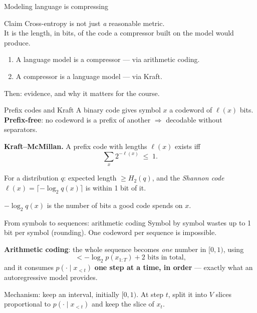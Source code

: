 \documentclass[11pt,aspectratio=169]{beamer}
\newcommand{\dest}[1]{\textcolor{structure}{\textbf{#1}}}
\begin{document}
\begin{frame}{Modeling language is compressing}
  \begin{block}{Claim}
    Cross-entropy is not just \emph{a} reasonable metric.\\
    It is the length, in bits, of the code a compressor built on the model would produce.
  \end{block}

  \vspace{1.2em}
  \begin{enumerate}
    \item A language model is a compressor --- via arithmetic coding.
    \item A compressor is a language model --- via Kraft.
  \end{enumerate}
  Then: evidence, and why it matters for the course.
\end{frame}

\begin{frame}{Prefix codes and Kraft}
  A binary code gives symbol $x$ a codeword of $\ell(x)$ bits.
  \dest{Prefix-free}: no codeword is a prefix of another $\Rightarrow$ decodable without
  separators.

  \vspace{0.8em}
  \textbf{Kraft--McMillan.} A prefix code with lengths $\ell(x)$ exists iff
  \[
    \sum_x 2^{-\ell(x)} \;\le\; 1 .
  \]

  \vspace{0.8em}
  For a distribution $q$: expected length $\ge H_2(q)$, and the \emph{Shannon code}
  $\ell(x) = \lceil -\log_2 q(x)\rceil$ is within 1 bit of it.

  \vspace{0.4em}
  \begin{block}{}
    $-\log_2 q(x)$ is the number of bits a good code spends on $x$.
  \end{block}
\end{frame}

\begin{frame}{From symbols to sequences: arithmetic coding}
  Symbol by symbol wastes up to 1 bit per symbol (rounding).
  One codeword per sequence is impossible.

  \vspace{0.8em}
  \dest{Arithmetic coding}: the whole sequence becomes \emph{one} number in $[0,1)$, using
  \[
    < -\log_2 p(x_{1:T}) + 2 \text{ bits in total,}
  \]
  and it consumes $p(\cdot\mid x_{<t})$ \textbf{one step at a time, in order} --- exactly
  what an autoregressive model provides.

  \vspace{0.8em}
  Mechanism: keep an interval, initially $[0,1)$. At step $t$, split it into $V$ slices
  proportional to $p(\cdot\mid x_{<t})$ and keep the slice of $x_t$.
\end{frame}
\end{document}
